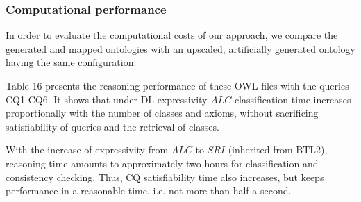 %



\subsubsection*{Computational performance}
In order to evaluate the computational costs of our approach, we compare the generated and mapped ontologies with an upscaled, artificially generated ontology having the same configuration.

Table 16 presents the reasoning performance of these OWL files with the queries CQ1-CQ6. It shows that under DL expressivity $ALC$  classification time increases proportionally with the number of classes and axioms, without sacrificing satisfiability of queries and the retrieval of classes. 

With the increase of expressivity from $ALC$ to $SRI$ (inherited from BTL2), reasoning time amounts to approximately two hours for classification and consistency checking. Thus, CQ satisfiability time also increases, but keeps performance in a reasonable time, i.e. not more than half a second. 


%
%

